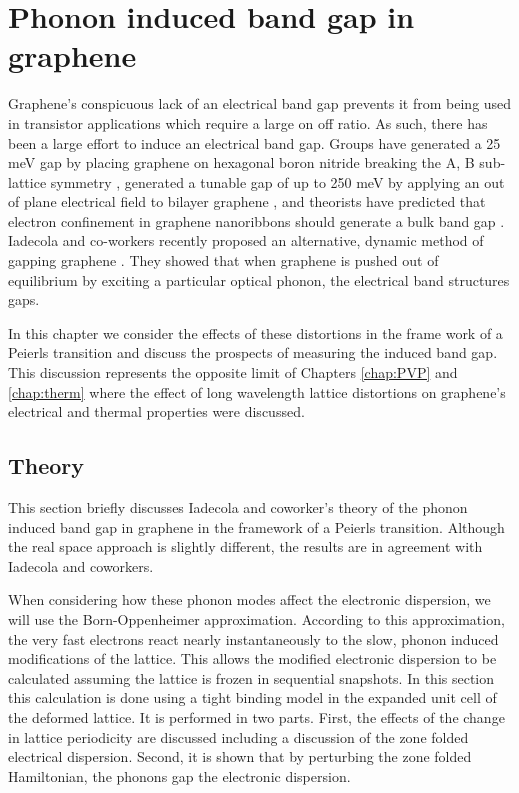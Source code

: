 \chapter{Phonon induced band gap in graphene \label{chap:kek}}
Graphene's conspicuous lack of an electrical band gap prevents it from being used in transistor applications which require a large on off ratio.
As such, there has been a large effort to induce an electrical band gap.
Groups have generated a 25 meV gap by placing graphene on hexagonal boron nitride breaking the A, B sub-lattice symmetry \cite{Hunt2013}, generated a tunable gap of up to 250 meV by applying an out of plane electrical field to bilayer graphene \cite{Zhang2009}, and theorists have predicted that electron confinement in graphene nanoribbons should generate a bulk band gap \cite{CastroNeto2009}.
Iadecola and co-workers recently proposed an alternative, dynamic method of gapping graphene \cite{Iadecola2013,Iadecola2013a}.
They showed that when graphene is pushed out of equilibrium by exciting a particular optical phonon, the electrical band structures gaps. 

In this chapter we consider the effects of these distortions in the frame work of a Peierls transition and discuss the prospects of measuring the induced band gap.
This discussion represents the opposite limit of Chapters \ref{chap:PVP} and \ref{chap:therm} where the effect of long wavelength lattice distortions on graphene's electrical and thermal properties were discussed.

\section{Theory}
This section briefly discusses Iadecola and coworker's theory of the phonon induced band gap in graphene in the framework of a Peierls transition.
Although the real space approach is slightly different, the results are in agreement with Iadecola and coworkers.

When considering how these phonon modes affect the electronic dispersion, we will use the Born-Oppenheimer approximation.
According to this approximation, the very fast electrons react nearly instantaneously to the slow, phonon induced modifications of the lattice.
This allows the modified electronic dispersion to be calculated assuming the lattice is frozen in sequential snapshots.
In this section this calculation is done using a tight binding model in the expanded unit cell of the deformed lattice.
It is performed in two parts.
First, the effects of the change in lattice periodicity are discussed including a discussion of the zone folded electrical dispersion.
Second, it is shown that by perturbing the zone folded Hamiltonian, the phonons gap the electronic dispersion.

